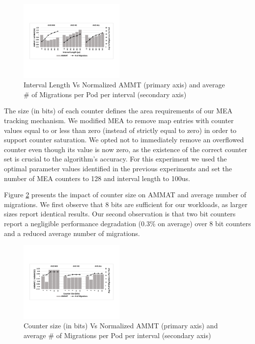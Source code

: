 \begin{figure}[h]
  \includegraphics[width=0.46\textwidth]{figures/interval_length_normalized.pdf}
  \caption{Interval Length Vs Normalized AMMT (primary axis) and average \# of Migrations per Pod per interval (secondary axis)}
  \label{fig:interval}
\end{figure}

The size (in bits) of each counter defines the area requirements of our MEA tracking mechanism.  
We modified MEA to remove map entries with counter values equal to or less than zero (instead of strictly equal to zero) in order to support counter saturation. We opted not to immediately remove an overflowed counter even though its value is now zero, as the existence of the correct counter set is crucial to the algorithm's accuracy. For this experiment we used the optimal parameter values identified in the previous experiments and set the number of MEA counters to 128 and interval length to 100us. 

Figure \ref{fig:counter_size} presents the impact of counter size on AMMAT and average number of migrations. We first observe that 8 bits are sufficient for our workloads, as larger sizes report identical results. Our second observation is that two bit counters report a negligible performance degradation (0.3\% on average) over 8 bit counters and a reduced average number of migrations.

\begin{figure}[h]
  \includegraphics[width=0.46\textwidth]{figures/counter_size_normalized.pdf}
  \caption{Counter size (in bits) Vs Normalized AMMT (primary axis) and average \# of Migrations per Pod per interval (secondary axis)}
  \label{fig:counter_size}
\end{figure}

